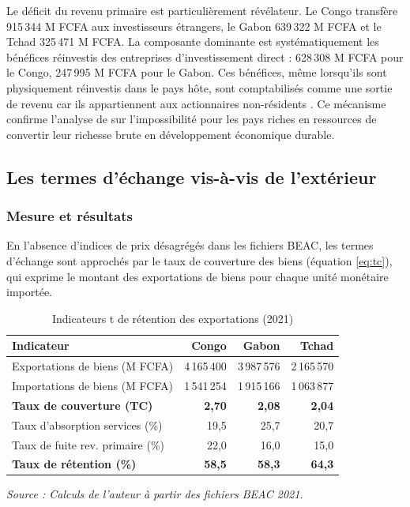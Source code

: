 \documentclass[12pt,a4paper]{article}
\begin{document}
Le déficit du revenu primaire est particulièrement révélateur. Le Congo transfère 915\,344
M FCFA aux investisseurs étrangers, le Gabon 639\,322 M FCFA et le Tchad 325\,471 M FCFA.
La composante dominante est systématiquement les bénéfices réinvestis des entreprises
d'investissement direct : 628\,308 M FCFA pour le Congo, 247\,995 M FCFA pour le Gabon.
Ces bénéfices, même lorsqu'ils sont physiquement réinvestis dans le pays hôte, sont
comptabilisés comme une sortie de revenu car ils appartiennent aux actionnaires non-résidents
\parencite{imf2009bpm6}. Ce mécanisme confirme l'analyse de \textcite{sachswarner1995} sur
l'impossibilité pour les pays riches en ressources de convertir leur richesse brute en
développement économique durable.

\subsection{Les termes d'échange vis-à-vis de l'extérieur}

\subsubsection{Mesure et résultats}

En l'absence d'indices de prix désagrégés dans les fichiers BEAC, les termes d'échange sont
approchés par le taux de couverture des biens (équation \ref{eq:tc}), qui exprime le montant
des exportations de biens pour chaque unité monétaire importée.

\begin{table}[h!]
  \centering
  \caption{Indicateurs t de rétention des exportations (2021)}
  \label{tab:termes_echange}
  \begin{tabular}{lrrr}
    \toprule
    \textbf{Indicateur} & \textbf{Congo} & \textbf{Gabon} & \textbf{Tchad} \\
    \midrule
    Exportations de biens (M FCFA)    & 4\,165\,400 & 3\,987\,576 & 2\,165\,570 \\
    Importations de biens (M FCFA)    & 1\,541\,254 & 1\,915\,166 & 1\,063\,877 \\
    \textbf{Taux de couverture (TC)}  & \textbf{2,70} & \textbf{2,08} & \textbf{2,04} \\
    \midrule
    Taux d'absorption services (\%)   & 19,5 & 25,7 & 20,7 \\
    Taux de fuite rev. primaire (\%)  & 22,0 & 16,0 & 15,0 \\
    \textbf{Taux de rétention (\%)}   & \textbf{58,5} & \textbf{58,3} & \textbf{64,3} \\
    \bottomrule
  \end{tabular}

  \smallskip
  \footnotesize\textit{Source : Calculs de l'auteur à partir des fichiers BEAC 2021.}
\end{table}
\end{document}
